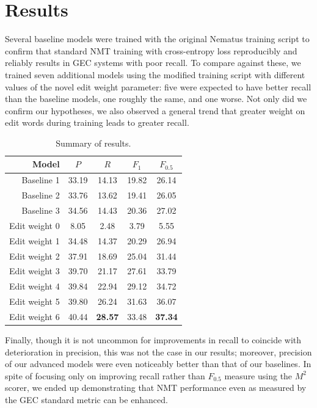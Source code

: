 \chapter{Results} \label{ch:results}
Several baseline models were trained with the original Nematus training script to confirm that standard NMT training with cross-entropy loss reproducibly and reliably results in GEC systems with poor recall. To compare against these, we trained seven additional models using the modified training script with different values of the novel edit weight parameter: five were expected to have better recall than the baseline models, one roughly the same, and one worse. Not only did we confirm our hypotheses, we also observed a general trend that greater weight on edit words during training leads to greater recall.

\begin{table}[h]
\centering
\begin{tabular}{|r|c|c|c|c|}
\hline
Model & $P$ & $R$ & $F_1$ & $F_{0.5}$ \\ \hline \hline
Baseline 1 & 33.19 & 14.13 & 19.82 & 26.14 \\ \hline
Baseline 2 & 33.76 & 13.62 & 19.41 & 26.05 \\ \hline
Baseline 3 & 34.56 & 14.43 & 20.36 & 27.02 \\ \hline \hline
Edit weight 0 & 8.05 & 2.48 & 3.79 & 5.55 \\ \hline
Edit weight 1 & 34.48 & 14.37 & 20.29 & 26.94 \\ \hline
Edit weight 2 & 37.91 & 18.69 & 25.04 & 31.44 \\ \hline
Edit weight 3 & 39.70 & 21.17 & 27.61 & 33.79 \\ \hline
Edit weight 4 & 39.84 & 22.94 & 29.12 & 34.72 \\ \hline
Edit weight 5 & 39.80 & 26.24 & 31.63 & 36.07 \\ \hline
Edit weight 6 & 40.44 & \textbf{28.57} & 33.48 & \textbf{37.34} \\ \hline
\end{tabular}
\caption{Summary of results.}
\label{tab:results}
\end{table}

Finally, though it is not uncommon for improvements in recall to coincide with deterioration in precision, this was not the case in our results; moreover, precision of our advanced models were even noticeably better than that of our baselines. In spite of focusing only on improving recall rather than $F_{0.5}$ measure using the $M^2$ scorer, we ended up demonstrating that NMT performance even as measured by the GEC standard metric can be enhanced.

